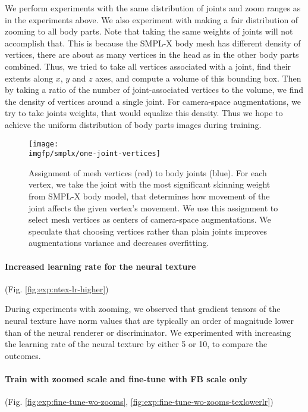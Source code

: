 We perform experiments with the same distribution of joints and zoom ranges as in the experiments above. We also experiment with making a fair distribution of zooming to all body parts. Note that taking the same weights of joints will not accomplish that. This is because the SMPL-X body mesh has different density of vertices, there are about as many vertices in the head as in the other body parts combined. Thus, we  tried to take all vertices associated with a joint, find their extents along $x$, $y$ and $z$ axes, and compute a volume of this bounding box. Then by taking a ratio of the number of joint-associated vertices to the volume, we find the density of vertices around a single joint. For camera-space augmentations, we try to take joints weights, that would equalize this density. Thus we hope to achieve the uniform distribution of body parts images during training.

\begin{figure}[!htpb]
	\centering
	\texttt{[image: \\imgfp/smplx/one-joint-vertices]}%
	\caption{Assignment of mesh vertices (red) to body joints (blue). For each vertex, we take the joint with the most significant skinning weight from SMPL-X body model, that determines how movement of the joint affects the given vertex's movement. We use this assignment to select mesh vertices as centers of camera-space augmentations. We speculate that choosing vertices rather than plain joints improves augmentations variance and decreases overfitting.}
	\label{fig:smplx-vert2joint}
\end{figure}

\vspace{-15pt}\paragraph{Increased learning rate for the neural texture}(Fig. \ref{fig:exp:ntex-lr-higher})\mbox{}\nopagebreak

During experiments with zooming, we observed that gradient tensors of the neural texture have norm values that are typically an order of magnitude lower than of the neural renderer or discriminator. We experimented with increasing the learning rate of the neural texture by either 5 or 10, to compare the outcomes.

\vspace{-15pt}\paragraph{Train with zoomed scale and fine-tune with FB scale only}(Fig. \ref{fig:exp:fine-tune-wo-zooms}, \ref{fig:exp:fine-tune-wo-zooms-texlowerlr})\mbox{}\nopagebreak

